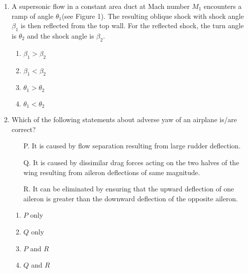 \documentclass[journal,12pt,onecolumn]{IEEEtran}
\theoremstyle{remark}
\begin{document}
\begin{enumerate}

 \item A supersonic flow in a constant area duct at Mach number $M_1$ encounters a ramp of angle $\theta_1$(see Figure 1). The resulting oblique shock with shock angle $\beta_1$ is then reflected from the top wall. For the reflected shock, the turn angle is $\theta_2$ and the shock angle is $\beta_2$.

      \begin{figure}[H]
        \centering
    \end{figure}
       



 
    \begin{enumerate}
        \item $\beta_1 > \beta_2$
        \item $\beta_1 < \beta_2$
        \item $\theta_1 > \theta_2$
        \item $\theta_1 < \theta_2$
    \end{enumerate}
    
    \item Which of the following statements about adverse yaw of an airplane is/are correct?
    \begin{enumerate}
        \item [P.] It is caused by flow separation resulting from large rudder deflection.
        \item [Q.]It is caused by dissimilar drag forces acting on the two halves of the wing resulting from aileron deflections of same magnitude.
        \item [R.]It can be eliminated by ensuring that the upward deflection of one aileron is greater than the downward deflection of the opposite aileron.
        \end{enumerate}
        \begin{enumerate}
           
        \item $P$ only
        \item $Q$ only
        \item $P$ and $R$
        \item $Q$ and $R$
    \end{enumerate}
    

\end{enumerate}
\end{document}
